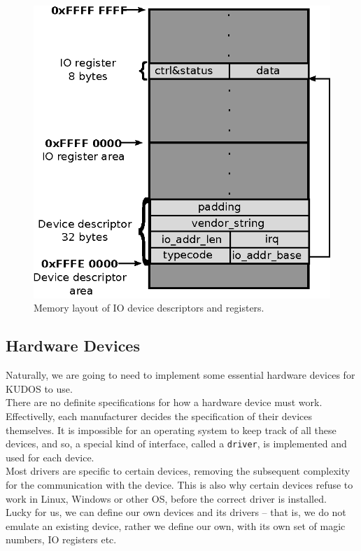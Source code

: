 \begin{figure}[H]
	\centering
	\includegraphics[scale=1]{io/io_memory_layout.eps}
	\caption{Memory layout of IO device descriptors and registers.}
	\label{fig:io_memory_layout}
\end{figure}




\subsection{Hardware Devices}
Naturally, we are going to need to implement some essential hardware devices
for KUDOS to use.\\
There are no definite specifications for how a hardware device must work.
Effectivelly, each manufacturer decides the specification of their devices
themselves. It is impossible for an operating system to keep track of all these
devices, and so, a special kind of interface, called a \texttt{driver},
is implemented and used for each device.\\
Most drivers are specific to certain devices, removing the subsequent complexity
for the communication with the device. This is also why certain devices refuse
to work in Linux, Windows or other OS, before the correct driver is installed.
\cite{microsoft:driver}\\
Lucky for us, we can define our own devices and its drivers -- that is,
we do not emulate an existing device, rather we define our own, with its own
set of magic numbers, IO registers etc.


